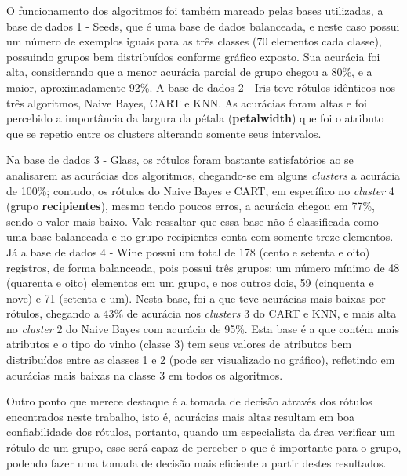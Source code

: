 O funcionamento dos algoritmos foi também marcado pelas bases utilizadas, a base de dados 1 - Seeds, que é uma base de dados balanceada, e neste caso possui um número de exemplos iguais para as três classes (70 elementos cada classe), possuindo grupos bem distribuídos conforme gráfico exposto. Sua acurácia foi alta, considerando que a menor acurácia parcial de grupo chegou a 80\%, e a maior, aproximadamente 92\%. A base de dados 2 - Iris teve rótulos idênticos nos três algoritmos, Naive Bayes, CART e KNN. As acurácias foram altas e foi percebido a importância da largura da pétala (\textbf{petalwidth}) que foi o atributo que se repetio entre os clusters alterando somente seus intervalos.

Na base de dados 3 - Glass, os rótulos foram bastante satisfatórios ao se analisarem as acurácias dos algoritmos, chegando-se em alguns \textit{clusters} a acurácia de 100\%; contudo, os rótulos do Naive Bayes e CART, em específico no \textit{cluster} 4 (grupo \textbf{recipientes}), mesmo tendo poucos erros, a acurácia chegou em 77\%, sendo o valor mais baixo. Vale ressaltar que essa base não é classificada como uma base balanceada e no grupo recipientes conta com somente treze elementos. Já a base de dados 4 - Wine possui um total de 178 (cento e setenta e oito) registros, de forma balanceada, pois possui três grupos; um número mínimo de 48 (quarenta e oito) elementos em um grupo, e nos outros dois, 59 (cinquenta e nove) e 71 (setenta e um). Nesta base, foi a que teve acurácias mais baixas por rótulos, chegando a 43\% de acurácia nos \textit{clusters} 3 do CART e KNN, e mais alta no \textit{cluster} 2 do Naive Bayes com acurácia de 95\%.
Esta base é a que contém mais atributos e o tipo do vinho (classe 3) tem seus valores de atributos  bem distribuídos entre as classes 1 e 2 (pode ser visualizado no gráfico), refletindo em acurácias mais baixas na classe 3 em todos os algoritmos.

Outro ponto que merece destaque é a tomada de decisão através dos rótulos encontrados neste trabalho, isto é, acurácias mais altas resultam em boa confiabilidade dos rótulos, portanto, quando um especialista da área verificar um rótulo de um grupo, esse será capaz de perceber o que é importante para o grupo, podendo fazer uma tomada de decisão mais eficiente a partir destes resultados. 



